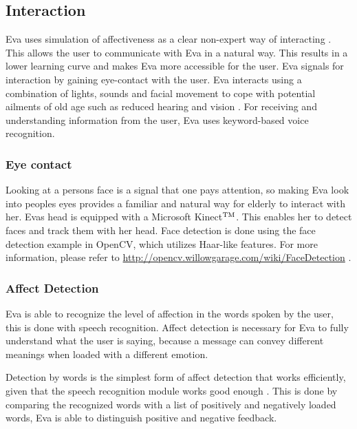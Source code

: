 \documentclass[project_eva.tex]{subfiles}
\begin{document}
\subsection*{Interaction}
Eva uses simulation of affectiveness as a clear non-expert way of interacting \cite{Thomaz} . This allows the user to communicate with Eva in a natural way.  This results in a lower learning curve and makes Eva more accessible for the user. Eva signals for interaction by gaining eye-contact with the user. Eva interacts using a combination of lights, sounds and facial movement to cope with potential ailments of old age  such as reduced hearing and vision . For receiving and understanding information from the user, Eva uses keyword-based voice recognition. 

\subsubsection*{Eye contact}
Looking at a person\textquotesingle s face is a signal that one pays attention, so making Eva look into 
people\textquotesingle s eyes provides a familiar and natural way for elderly to interact with her. 
Eva\textquotesingle s head is equipped with a Microsoft Kinect$\rm {}^{TM}$. This enables her to detect faces and track them with her head.  Face detection is done using the face detection example in OpenCV, which utilizes Haar-like features. 
For more information, please refer to \url{http://opencv.willowgarage.com/wiki/FaceDetection} \cite{FaceDetection} .

\subsubsection*{Affect Detection}
Eva is able to recognize the level of affection in the words spoken by the user, this is done with speech recognition. Affect detection is necessary for Eva to fully understand what the user is saying, because a message can convey different meanings when loaded with a different emotion.

Detection by words is the simplest form of affect detection that works efficiently, given that the speech recognition module works good enough \cite{affection} . This is done by comparing the recognized words with a list of positively and negatively loaded words, Eva is able to distinguish positive and negative feedback.
 
\end{document}
